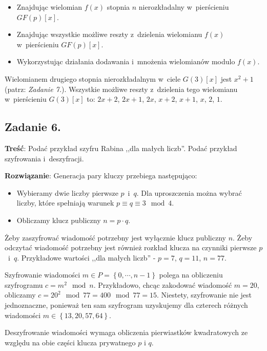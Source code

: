 \documentclass[a4paper,10pt, twocolumn]{article}
\begin{document}
\begin{itemize}
 \item Znajdując wielomian $f(x)$ stopnia $n$ nierozkładalny w~pierścieniu $GF(p)[x]$.
 \item Znajdując wszystkie możliwe reszty z~dzielenia wielomianu $f(x)$ w~pierścieniu $GF(p)[x]$.
 \item Wykorzystując działania dodawania i~mnożenia wielomianów modulo $f(x)$.
\end{itemize}

Wielomianem drugiego stopnia nierozkładalnym w~ciele $G(3)[x]$ jest $x^2 + 1$ (patrz: \emph{Zadanie 7.}). Wszystkie możliwe reszty z~dzielenia tego wielomianu w~pierścieniu $G(3)[x]$ to: $2x + 2$, $2x + 1$, $2x$, $x + 2$, $x + 1$, $x$, $2$, $1$.

\subsection{Zadanie 6.}

\textbf{Treść}: Podać przykład szyfru Rabina ,,dla małych liczb''. Podać przykład szyfrowania i~deszyfracji.

\textbf{Rozwiązanie}: Generacja pary kluczy przebiega następująco:

\begin{itemize}
 \item Wybieramy dwie liczby pierwsze $p$~i~$q$. Dla uproszczenia można wybrać liczby, które spełniają warunek $p \equiv q \equiv 3 \mod 4$. 
 \item Obliczamy klucz publiczny $n = p \cdot q$.
\end{itemize}

\noindent Żeby zaszyfrować wiadomość potrzebny jest wyłącznie klucz publiczny $n$. Żeby odczytać wiadomość potrzebny jest również rozkład klucza na czynniki pierwsze $p$~i~$q$. Przykładowe wartości ,,dla małych liczb'' - $p = 7$, $q = 11$, $n = 77$.

\noindent Szyfrowanie wiadomości $m \in P = \left\{0, \cdots, n - 1 \right\}$ polega na obliczeniu szyfrogramu $c = m^{2} \mod n$. Przykładowo, chcąc zakodować wiadomość $m = 20$, obliczamy $c = 20^2 \mod 77 = 400 \mod 77 = 15$. Niestety, szyfrowanie nie jest jednoznaczne, ponieważ ten sam szyfrogram uzyskujemy dla czterech różnych wiadomości $m \in \left\{13, 20, 57, 64\right\}$.

\noindent Deszyfrowanie wiadomości wymaga obliczenia pierwiastków kwadratowych ze względu na obie części klucza prywatnego $p$ i $q$.
\end{document}
